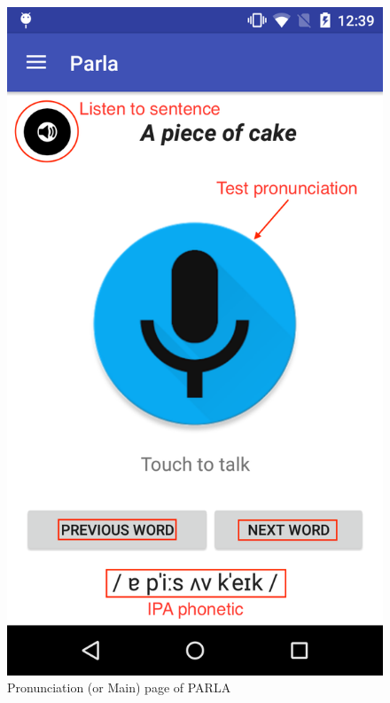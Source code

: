 \begin{figure}[!ht]
	\centering
	\begin{minipage}{.5\textwidth}
		\centering
		\includegraphics[scale=0.18]{Figures/screenshots/main.png}
		\caption{Pronunciation (or Main) page of PARLA}
		\label{fig:pronunciation_page}
	\end{minipage}%
	\begin{minipage}{.5\textwidth}
		\centering

\end{minipage}
\end{figure}
